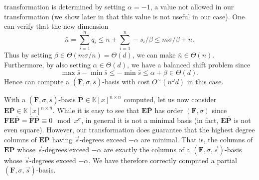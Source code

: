 transformation is determined by setting $\alpha=-1$, a value not
allowed in our transformation (we show later in 
that this value is not useful in our case). One can verify that the
new dimension \[
\bar{n}=\sum_{i=1}^{n}q_{i}\le n+\sum_{i=1}^{n}-s_{i}/\beta\le m\sigma/\beta+n.\]
 Thus by setting $\beta\in\Theta\left(m\sigma/n\right)=\Theta\left(d\right)$,
we can make $\bar{n}\in\Theta\left(n\right)$. Furthermore, by also
setting $\alpha\in\Theta\left(d\right)$, we have a balanced shift
problem since \[
\max\bar{s}-\min\bar{s}\le-\min\bar{s}\le\alpha+\beta\in\Theta(d).\]
 Hence  can compute a $\left(\bar{\mathbf{F}},\sigma,\bar{s}\right)$-basis
with cost $O^{\sim}\left(n^{\omega}d\right)$ in this case.

With a $\left(\bar{\mathbf{F}},\sigma,\bar{s}\right)$-basis $\bar{\mathbf{P}}\in\mathbb{K}\left[x\right]^{\bar{n}\times\bar{n}}$
computed, let us now consider $\mathbf{E}\bar{\mathbf{P}}\in\mathbb{K}\left[x\right]^{n\times\bar{n}}$.
While it is easy to see that $\mathbf{E}\bar{\mathbf{P}}$ has order
$\left(\mathbf{F},\sigma\right)$ since \textbf{$\mathbf{F}\mathbf{E}\bar{\mathbf{P}}=\bar{\mathbf{F}}\bar{\mathbf{P}}\equiv0\mod x^{\sigma}$},
in general it is not a minimal basis (in fact, $\mathbf{E}\bar{\mathbf{P}}$
is not even square). However, our transformation does guarantee that
the highest degree columns of $\mathbf{E}\bar{\mathbf{P}}$ having
$\vec{s}$-degrees exceed $-\alpha$ are minimal. That is, the columns
of $\mathbf{E}\bar{\mathbf{P}}$ whose $\vec{s}$-degrees exceed $-\alpha$
are exactly the columns of a $\left(\mathbf{F},\sigma,\vec{s}\right)$-basis
whose $\vec{s}$-degrees exceed $-\alpha$. We have therefore correctly
computed a partial $\left(\mathbf{F},\sigma,\vec{s}\right)$-basis. 
